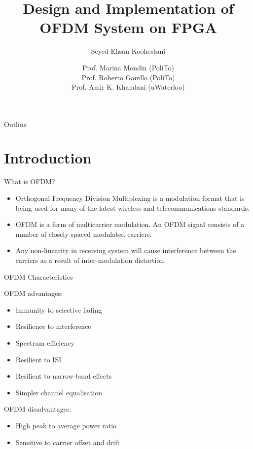 \documentclass{beamer}
\title{Design and Implementation of OFDM System on FPGA}
\author{Seyed-Ehsan Koohestani}
\institute[PoliTo] %
{

  Electronics and Telecommunications\\
  Politecnico di Torino
  }
\date{
Prof. Marina Mondin (PoliTo)\\
Prof. Roberto Garello (PoliTo)\\
Prof. Amir K. Khandani (uWaterloo)
}
\begin{document}
\begin{frame}
  \titlepage
\end{frame}

\begin{frame}{Outline}
  \tableofcontents
\end{frame}

\section{Introduction}

\begin{frame}{What is OFDM?}
  \begin{itemize}
  
  \item {
\alert{Orthogonal Frequency Division Multiplexing} is a modulation format that is being used for many of the latest wireless and telecommunications standards.
  }
  
  \item {
OFDM is a form of multicarrier modulation. An OFDM signal consists of a number of closely spaced modulated carriers.
  }


  \item {
Any non-linearity in receiving system will cause interference between the carriers as a result of inter-modulation distortion.
  }

  \end{itemize}
\end{frame}

\begin{frame}{OFDM Characteristics}

OFDM advantages:
  \begin{itemize}
   
  \item {
Immunity to selective fading
  }
  
  \item {  
Resilience to interference
  }
  
  \item {  
Spectrum efficiency
  }
  
  \item {  
Resilient to ISI
  }
  
  \item {  
Resilient to narrow-band effects
  } 
  
   \item {  
Simpler channel equalisation
  }
  \end{itemize}

OFDM disadvantages:
  \begin{itemize}
   
  \item {
High peak to average power ratio
  }
  
  \item {  
Sensitive to carrier offset and drift
  }
   \end{itemize}
\end{frame}
\end{document}
